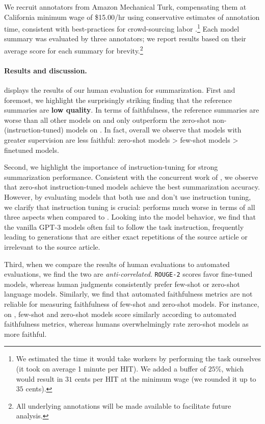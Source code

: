 We recruit annotators from Amazon Mechanical Turk, compensating them at California minimum wage of \$15.00/hr using conservative estimates of annotation time, consistent with best-practices for crowd-sourcing labor \citep{whiting2019fair}.\footnote{We estimated the time it would take workers by performing the task ourselves (it took on average 1 minute per HIT). We added a buffer of $25\%$, which would result in $31$ cents per HIT at the minimum wage (we rounded it up to $35$ cents).}
Each model summary was evaluated by three annotators; we report results based on their average score for each summary for brevity.\footnote{All underlying annotations will be made available to facilitate future analysis.}



\paragraph{Results and discussion.}
 displays the results of our human evaluation for summarization.
First and foremost, we highlight the surprisingly striking finding that the reference summaries are \textbf{low quality}.
In terms of faithfulness, the reference summaries are worse than all other models on \xsum and only outperform the zero-shot non-(instruction-tuned) models on \cnndm. 
In fact, overall we observe that models with greater supervision are less faithful: zero-shot models > few-shot models > finetuned models.

Second, we highlight the importance of instruction-tuning for strong summarization performance.
Consistent with the concurrent work of \citet{goyal2022news}, we observe that zero-shot instruction-tuned models achieve the best summarization accuracy.
However, by evaluating models that both use and don't use instruction tuning, we clarify that instruction tuning is crucial: \gptdavinci performs much worse in terms of all three aspects when compared to \instructdavinci.
Looking into the model behavior, we find that the vanilla GPT-3 models often fail to follow the task instruction, frequently leading to  generations that are either exact repetitions of the source article or irrelevant to the source article.

Third, when we compare the results of human evaluations to automated evaluations, we find the two are \textit{anti-correlated}.
\texttt{ROUGE-2} scores favor fine-tuned models, whereas human judgments consistently prefer few-shot or zero-shot language models. Similarly, we find that automated faithfulness metrics are not reliable for measuring faithfulness of few-shot and zero-shot models. 
For instance, on \xsum, few-shot and zero-shot models score similarly according to automated faithfulness metrics, whereas humans overwhelmingly rate zero-shot models as more faithful.


